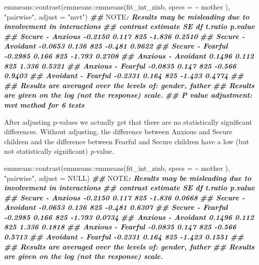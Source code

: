 \documentclass[
]{book}
\newenvironment{Shaded}{\begin{snugshade}}{\end{snugshade}}
\newcommand{\AlertTok}[1]{\textcolor[rgb]{0.94,0.16,0.16}{#1}}
\newcommand{\AttributeTok}[1]{\textcolor[rgb]{0.77,0.63,0.00}{#1}}
\newcommand{\ConstantTok}[1]{\textcolor[rgb]{0.00,0.00,0.00}{#1}}
\newcommand{\DocumentationTok}[1]{\textcolor[rgb]{0.56,0.35,0.01}{\textbf{\textit{#1}}}}
\newcommand{\FunctionTok}[1]{\textcolor[rgb]{0.00,0.00,0.00}{#1}}
\newcommand{\NormalTok}[1]{#1}
\newcommand{\SpecialCharTok}[1]{\textcolor[rgb]{0.00,0.00,0.00}{#1}}
\newcommand{\StringTok}[1]{\textcolor[rgb]{0.31,0.60,0.02}{#1}}
\begin{document}
\begin{Shaded}
\begin{Highlighting}[]
\NormalTok{emmeans}\SpecialCharTok{::}\FunctionTok{contrast}\NormalTok{(emmeans}\SpecialCharTok{::}\FunctionTok{emmeans}\NormalTok{(fit\_int\_zinb, }\AttributeTok{specs =} \SpecialCharTok{\textasciitilde{}}\NormalTok{ mother ),}
                  \StringTok{"pairwise"}\NormalTok{, }\AttributeTok{adjust =} \StringTok{"mvt"}\NormalTok{)}
\DocumentationTok{\#\# }\AlertTok{NOTE}\DocumentationTok{: Results may be misleading due to involvement in interactions}
\DocumentationTok{\#\#  contrast           estimate    SE  df t.ratio p.value}
\DocumentationTok{\#\#  Secure {-} Anxious    {-}0.2150 0.117 825  {-}1.836  0.2510}
\DocumentationTok{\#\#  Secure {-} Avoidant   {-}0.0653 0.136 825  {-}0.481  0.9622}
\DocumentationTok{\#\#  Secure {-} Fearful    {-}0.2985 0.166 825  {-}1.793  0.2708}
\DocumentationTok{\#\#  Anxious {-} Avoidant   0.1496 0.112 825   1.336  0.5321}
\DocumentationTok{\#\#  Anxious {-} Fearful   {-}0.0835 0.147 825  {-}0.566  0.9403}
\DocumentationTok{\#\#  Avoidant {-} Fearful  {-}0.2331 0.164 825  {-}1.423  0.4774}
\DocumentationTok{\#\# }
\DocumentationTok{\#\# Results are averaged over the levels of: gender, father }
\DocumentationTok{\#\# Results are given on the log (not the response) scale. }
\DocumentationTok{\#\# P value adjustment: mvt method for 6 tests}
\end{Highlighting}
\end{Shaded}

After adjusting p-values we actually get that there are no statistically significant differences. Without adjusting, the difference between Anxious and Secure children and the difference between Fearful and Secure children have a low (but not statistically significant) \emph{p}-value.

\begin{Shaded}
\begin{Highlighting}[]
\NormalTok{emmeans}\SpecialCharTok{::}\FunctionTok{contrast}\NormalTok{(emmeans}\SpecialCharTok{::}\FunctionTok{emmeans}\NormalTok{(fit\_int\_zinb, }\AttributeTok{specs =} \SpecialCharTok{\textasciitilde{}}\NormalTok{ mother ),}
                  \StringTok{"pairwise"}\NormalTok{, }\AttributeTok{adjust =} \ConstantTok{NULL}\NormalTok{)}
\DocumentationTok{\#\# }\AlertTok{NOTE}\DocumentationTok{: Results may be misleading due to involvement in interactions}
\DocumentationTok{\#\#  contrast           estimate    SE  df t.ratio p.value}
\DocumentationTok{\#\#  Secure {-} Anxious    {-}0.2150 0.117 825  {-}1.836  0.0668}
\DocumentationTok{\#\#  Secure {-} Avoidant   {-}0.0653 0.136 825  {-}0.481  0.6307}
\DocumentationTok{\#\#  Secure {-} Fearful    {-}0.2985 0.166 825  {-}1.793  0.0734}
\DocumentationTok{\#\#  Anxious {-} Avoidant   0.1496 0.112 825   1.336  0.1818}
\DocumentationTok{\#\#  Anxious {-} Fearful   {-}0.0835 0.147 825  {-}0.566  0.5713}
\DocumentationTok{\#\#  Avoidant {-} Fearful  {-}0.2331 0.164 825  {-}1.423  0.1551}
\DocumentationTok{\#\# }
\DocumentationTok{\#\# Results are averaged over the levels of: gender, father }
\DocumentationTok{\#\# Results are given on the log (not the response) scale.}
\end{Highlighting}
\end{Shaded}
\end{document}
